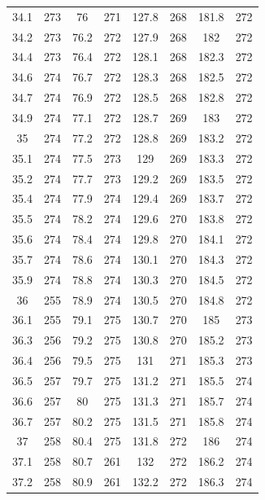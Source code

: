 \documentclass[12pt]{ctexart}
\numberwithin{equation}{section}
\begin{document}
\begin{longtable}{cc|cc|cc|cc}
34.1  &  273  &  76  &  271  &  127.8  &  268  &  181.8  &  272  \\
34.2  &  273  &  76.2  &  272  &  127.9  &  268  &  182  &  272  \\
34.4  &  273  &  76.4  &  272  &  128.1  &  268  &  182.3  &  272  \\
34.6  &  274  &  76.7  &  272  &  128.3  &  268  &  182.5  &  272  \\
34.7  &  274  &  76.9  &  272  &  128.5  &  268  &  182.8  &  272  \\
34.9  &  274  &  77.1  &  272  &  128.7  &  269  &  183  &  272  \\
35  &  274  &  77.2  &  272  &  128.8  &  269  &  183.2  &  272  \\
35.1  &  274  &  77.5  &  273  &  129  &  269  &  183.3  &  272  \\
35.2  &  274  &  77.7  &  273  &  129.2  &  269  &  183.5  &  272  \\
35.4  &  274  &  77.9  &  274  &  129.4  &  269  &  183.7  &  272  \\
35.5  &  274  &  78.2  &  274  &  129.6  &  270  &  183.8  &  272  \\
35.6  &  274  &  78.4  &  274  &  129.8  &  270  &  184.1  &  272  \\
35.7  &  274  &  78.6  &  274  &  130.1  &  270  &  184.3  &  272  \\
35.9  &  274  &  78.8  &  274  &  130.3  &  270  &  184.5  &  272  \\
36  &  255  &  78.9  &  274  &  130.5  &  270  &  184.8  &  272  \\
36.1  &  255  &  79.1  &  275  &  130.7  &  270  &  185  &  273  \\
36.3  &  256  &  79.2  &  275  &  130.8  &  270  &  185.2  &  273  \\
36.4  &  256  &  79.5  &  275  &  131  &  271  &  185.3  &  273  \\
36.5  &  257  &  79.7  &  275  &  131.2  &  271  &  185.5  &  274  \\
36.6  &  257  &  80  &  275  &  131.3  &  271  &  185.7  &  274  \\
36.7  &  257  &  80.2  &  275  &  131.5  &  271  &  185.8  &  274  \\
37  &  258  &  80.4  &  275  &  131.8  &  272  &  186  &  274  \\
37.1  &  258  &  80.7  &  261  &  132  &  272  &  186.2  &  274  \\
37.2  &  258  &  80.9  &  261  &  132.2  &  272  &  186.3  &  274  \\

\end{longtable}
\end{document}
